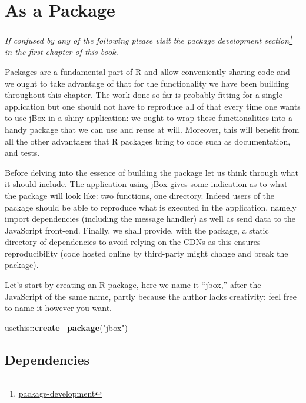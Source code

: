 \documentclass[
]{krantz}
\makeatletter
\newenvironment{Shaded}{\begin{snugshade}}{\end{snugshade}}
\newcommand{\KeywordTok}[1]{\textcolor[rgb]{0.27,0.27,0.27}{\textbf{#1}}}
\newcommand{\NormalTok}[1]{#1}
\newcommand{\OperatorTok}[1]{\textcolor[rgb]{0.43,0.43,0.43}{\textbf{#1}}}
\newcommand{\StringTok}[1]{\textcolor[rgb]{0.5,0.5,0.5}{#1}}
\renewcommand{\href}[2]{#2\footnote{\url{#1}}}
\newenvironment{kframe}{%
\medskip{}
\setlength{\fboxsep}{.8em}
 \def\at@end@of@kframe{}%
 \ifinner\ifhmode%
  \def\at@end@of@kframe{\end{minipage}}%
  \begin{minipage}{\columnwidth}%
 \fi\fi%
 \def\FrameCommand##1{\hskip\@totalleftmargin \hskip-\fboxsep
 \colorbox{shadecolor}{##1}\hskip-\fboxsep
     \hskip-\linewidth \hskip-\@totalleftmargin \hskip\columnwidth}%
 \MakeFramed {\advance\hsize-\width
   \@totalleftmargin\z@ \linewidth\hsize
   \@setminipage}}%
 {\par\unskip\endMakeFramed%
 \at@end@of@kframe}
\renewenvironment{Shaded}{\begin{kframe}}{\end{kframe}}
\makeatother
\begin{document}
\hypertarget{as-a-package}{%
\section*{As a Package}\label{as-a-package}}


\emph{If confused by any of the following please visit the \href{package-development}{package development section} in the first chapter of this book.}

Packages are a fundamental part of R and allow conveniently sharing code and we ought to take advantage of that for the functionality we have been building throughout this chapter. The work done so far is probably fitting for a single application but one should not have to reproduce all of that every time one wants to use jBox in a shiny application: we ought to wrap these functionalities into a handy package that we can use and reuse at will. Moreover, this will benefit from all the other advantages that R packages bring to code such as documentation, and tests.

Before delving into the essence of building the package let us think through what it should include. The application using jBox gives some indication as to what the package will look like: two functions, one directory. Indeed users of the package should be able to reproduce what is executed in the application, namely import dependencies (including the message handler) as well as send data to the JavaScript front-end. Finally, we shall provide, with the package, a static directory of dependencies to avoid relying on the CDNs as this ensures reproducibility (code hosted online by third-party might change and break the package).

Let's start by creating an R package, here we name it ``jbox,'' after the JavaScript of the same name, partly because the author lacks creativity: feel free to name it however you want.

\begin{Shaded}
\begin{Highlighting}[]
\NormalTok{usethis}\OperatorTok{::}\KeywordTok{create\_package}\NormalTok{(}\StringTok{"jbox"}\NormalTok{)}
\end{Highlighting}
\end{Shaded}

\hypertarget{dependencies}{%
\subsection{Dependencies}\label{dependencies}}
\end{document}
